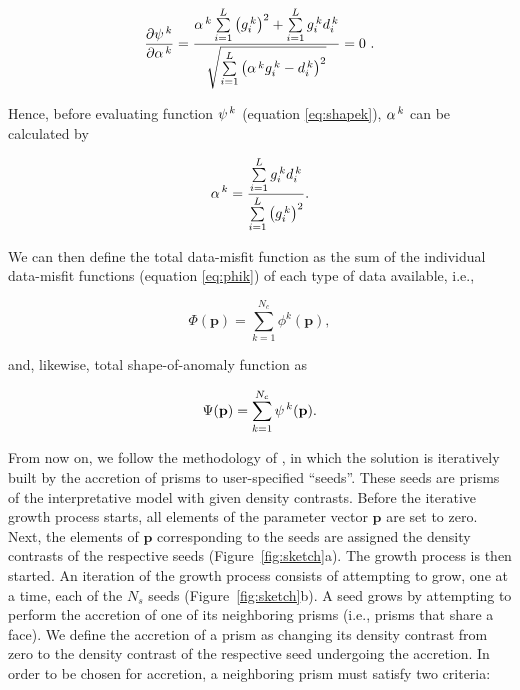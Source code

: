 \documentclass{segabs}
\newcommand{\vect}[1]{\mathbf{#1}}
\begin{document}
\begin{sloppypar}
\begin{equation}
    \dfrac{\partial \psi^{\thinspace k}}{\partial \alpha^{\thinspace k}} =
    \dfrac{\alpha^{\thinspace k}
        \sum\limits_{i=1}^{L}\left(g_{i}^{\thinspace k}\right)^{2} +
        \sum\limits_{i=1}^{L} g_{i}^{\thinspace k}d_{i}^{\thinspace k}}
        {\sqrt{\sum\limits_{i=1}^{L}
        \left(\alpha^{\thinspace k} g_{i}^{\thinspace k} - d_{i}^{\thinspace k}
        \right)^{2}}} = 0~.
\end{equation}

Hence, before evaluating function $\psi^{\thinspace k}$ (equation
\ref{eq:shapek}), $\alpha^{\thinspace k}$ can be calculated by \citep{Rene1986}

\begin{equation}
    \alpha^{\thinspace k} = \dfrac{
        \sum\limits_{i=1}^{L} g_{i}^{\thinspace k} d_{i}^{\thinspace k}
    }{
        \sum\limits_{i=1}^{L}\left( g_{i}^{\thinspace k}\right)^{2}
    }.
    \label{eq:alpha}
\end{equation}

We can then define the total data-misfit function as the sum of the individual
data-misfit functions (equation \ref{eq:phik}) of each type of data available,
i.e.,

\begin{equation}
    \Phi(\vect{p}) = \sum\limits_{k=1}^{N_{c}} \phi^{k}(\vect{p}),
    \label{eq:phi}
\end{equation}

and, likewise, total shape-of-anomaly function as

\begin{equation}
    \Psi(\vect{p}) = \sum\limits_{k=1}^{N_{c}} \psi^{\thinspace k}(\vect{p}).
    \label{eq:shape}
\end{equation}

From now on, we follow the methodology of \citet{Uieda2011}, in which the
solution is iteratively built by the accretion of prisms to user-specified
``seeds''.
These seeds are prisms of the interpretative model with given density contrasts.
Before the iterative growth process starts, all elements of the parameter vector
$\vect{p}$ are set to zero.
Next, the elements of $\vect{p}$ corresponding to the seeds are assigned the
density contrasts of the respective seeds (Figure~\ref{fig:sketch}a).
The growth process is then started.
An iteration of the growth process consists of attempting to grow, one at a
time, each of the $N_{s}$ seeds (Figure~\ref{fig:sketch}b).
A seed grows by attempting to perform the accretion of one of its neighboring
prisms (i.e., prisms that share a face).
We define the accretion of a prism as changing its density contrast from zero to
the density contrast of the respective seed undergoing the accretion.
In order to be chosen for accretion, a neighboring prism must satisfy two
criteria:


\end{sloppypar}
\end{document}
